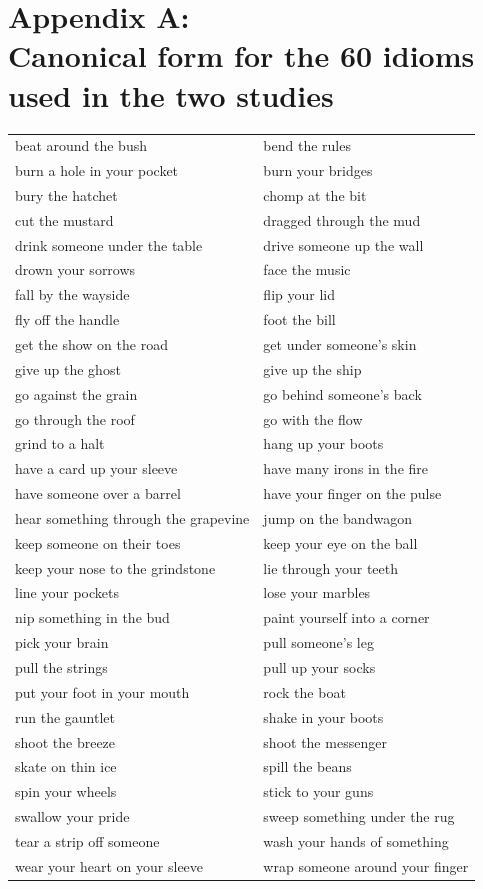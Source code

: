 \documentclass[output=paper
,modfonts
,nonflat]{langsci/langscibook}
\begin{document}
\newpage
\section*{Appendix A:\\ 
Canonical form for the 60 idioms used in the two studies}
\label{IdiomsAppendix}


\begin{table}
\begin{tabular}{ll}
beat around the bush & bend the rules\\
burn a hole in your pocket & burn your bridges\\
bury the hatchet & chomp at the bit\\
cut the mustard & dragged through the mud\\
drink someone under the table & drive someone up the wall\\
drown your sorrows & face the music\\
fall by the wayside & flip your lid\\
fly off the handle & foot the bill\\
get the show on the road & get under someone's skin\\
give up the ghost & give up the ship\\
go against the grain & go behind someone's back\\
go through the roof & go with the flow\\
grind to a halt & hang up your boots\\
have a card up your sleeve & have many irons in the fire\\
have someone over a barrel & have your finger on the pulse\\
hear something through the grapevine & jump on the bandwagon\\
keep someone on their toes & keep your eye on the ball\\
keep your nose to the grindstone & lie through your teeth\\
line your pockets & lose your marbles\\
nip something in the bud & paint yourself into a corner\\
pick your brain & pull someone's leg\\
pull the strings & pull up your socks\\
put your foot in your mouth & rock the boat\\
run the gauntlet & shake in your boots\\
shoot the breeze & shoot the messenger\\
skate on thin ice & spill the beans\\
spin your wheels & stick to your guns\\
swallow your pride & sweep something under the rug\\
tear a strip off someone & wash your hands of something\\
wear your heart on your sleeve & wrap someone around your finger\\
\end{tabular}
\end{table}



{\sloppy
\printbibliography
}
\end{document}
